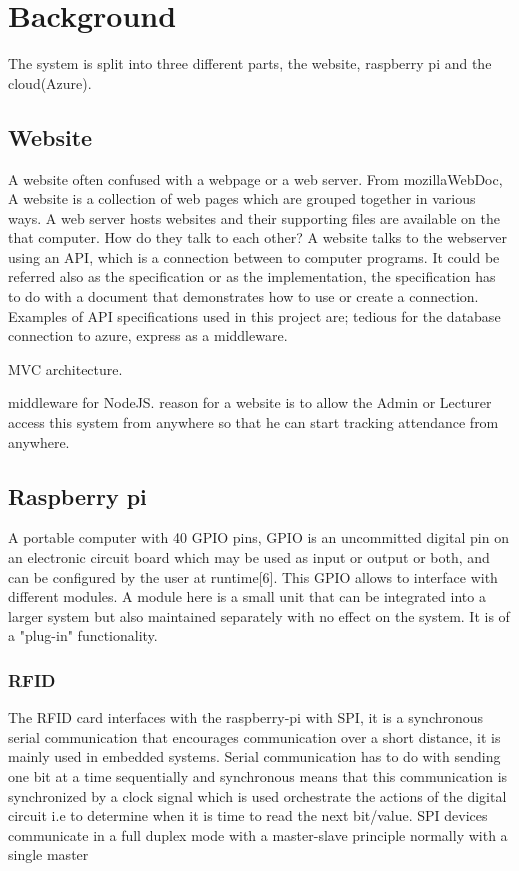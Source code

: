 \chapter{Background}
The system is split into three different parts, the website, raspberry pi and the cloud(Azure).



\section{Website}
A website often confused with a webpage or a web server. From mozillaWebDoc, A website is a collection of web pages which are grouped together in various ways. A web server hosts websites and their supporting files are available on the that computer. 
How do they talk to each other?
A website talks to the webserver using an API, which is a connection between to computer programs. It could be referred also as the specification or as the implementation, the specification has to do with a document that demonstrates how to use or create a connection. Examples of API specifications used in this project are; tedious for the database connection to azure, express as a middleware. 

MVC architecture.

middleware for NodeJS.
reason for a website is to allow the Admin or Lecturer access this system from anywhere so that he can start tracking attendance from anywhere.

\section{Raspberry pi}
A portable computer with 40 GPIO pins, 
GPIO is an uncommitted digital pin on an electronic circuit board which may be used as input or output or both, and can be configured by the user at runtime[6]. This GPIO allows to interface with different modules. A module here is a small unit that can be integrated into a larger system but also maintained separately with no effect on the system. It is of a "plug-in" functionality.


\subsection{RFID}
The RFID card interfaces with the raspberry-pi with SPI, it is a synchronous serial communication that encourages communication over a short distance, it is mainly used in embedded systems. Serial communication has to do with sending one bit at a time sequentially and synchronous means that this communication is synchronized by a clock signal which is used orchestrate the actions of the digital circuit i.e to determine when it is time to read the next bit/value. SPI devices communicate in a full duplex mode with a master-slave principle normally with a single master


